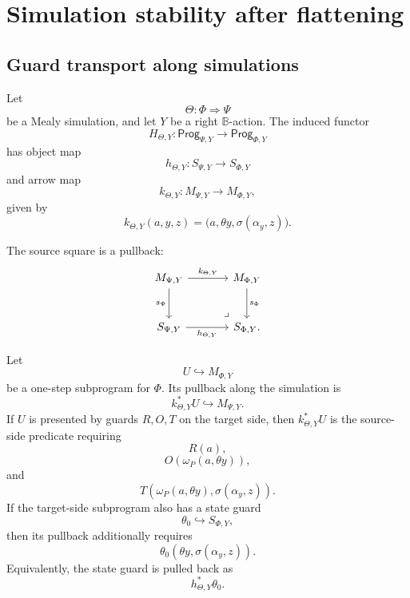 \section{Simulation stability after flattening}
\label{sec:poly-relative-simulation-stability}

\subsection{Guard transport along simulations}
\label{subsec:poly-relative-guard-transport-simulation}

Let
\[
\Theta:\Phi\Rightarrow\Psi
\]
be a Mealy simulation, and let \(Y\) be a right \(\mathbb B\)-action.  The
induced functor
\[
H_{\Theta,Y}:
\mathsf{Prog}_{\Psi,Y}\to\mathsf{Prog}_{\Phi,Y}
\]
has object map
\[
h_{\Theta,Y}:S_{\Psi,Y}\to S_{\Phi,Y}
\]
and arrow map
\[
k_{\Theta,Y}:M_{\Psi,Y}\to M_{\Phi,Y},
\]
given by
\[
k_{\Theta,Y}(a,y,z)
=
\bigl(a,\theta y,\sigma(\alpha_y,z)\bigr).
\]

The source square is a pullback:
\[
\begin{tikzcd}[column sep=large,row sep=large]
M_{\Psi,Y}
  \arrow[r,"k_{\Theta,Y}"]
  \arrow[d,"s_\Psi"']
&
M_{\Phi,Y}
  \arrow[d,"s_\Phi"]
\\
S_{\Psi,Y}
  \arrow[r,"h_{\Theta,Y}"']
&
S_{\Phi,Y}
\arrow[ul,phantom,very near start,"\lrcorner"] .
\end{tikzcd}
\]

\begin{proposition}
\label{prop:poly-relative-guard-transport-simulation}
Let
\[
U\hookrightarrow M_{\Phi,Y}
\]
be a one-step subprogram for \(\Phi\).  Its pullback along the simulation is
\[
k_{\Theta,Y}^\ast U\hookrightarrow M_{\Psi,Y}.
\]
If \(U\) is presented by guards \(R,O,T\) on the target side, then
\(k_{\Theta,Y}^\ast U\) is the source-side predicate requiring
\[
R(a),
\]
\[
O(\omega_P(a,\theta y)),
\]
and
\[
T(\omega_P(a,\theta y),\sigma(\alpha_y,z)).
\]
If the target-side subprogram also has a state guard
\[
\theta_0\hookrightarrow S_{\Phi,Y},
\]
then its pullback additionally requires
\[
\theta_0(\theta y,\sigma(\alpha_y,z)).
\]
Equivalently, the state guard is pulled back as
\[
h_{\Theta,Y}^{\ast}\theta_0.
\]
\end{proposition}

